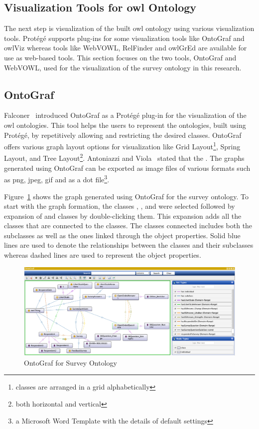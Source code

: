 \begin{doublespace}
\section{Visualization Tools for \ac{owl} Ontology}
\par The next step is visualization of the built \ac{owl} ontology using various visualization tools. Protégé supports plug-ins for some visualization tools like OntoGraf and \ac{owl}Viz whereas tools like WebVOWL, RelFinder and \ac{owl}GrEd are available for use as web-based tools. This section focuses on the two tools, OntoGraf and WebVOWL, used for the visualization of the survey ontology in this research.
\subsection{OntoGraf}
\par Falconer~\cite{falconer2010ontograf} introduced OntoGraf as a Protégé plug-in for the visualization of the \ac{owl} ontologies. This tool helps the users to represent the ontologies, built using Protégé, by repetitively allowing and restricting the desired classes. OntoGraf offers various graph layout options for visualization like Grid Layout\footnote{classes are arranged in a grid alphabetically}, Spring Layout, and Tree Layout\footnote{both horizontal and vertical}. Antoniazzi and Viola~\cite{antoniazz2018rdf} stated that the . The graphs generated using OntoGraf can be exported as image files of various formats such as \ac{png}, \ac{jpeg}, \ac{gif} and as a dot file\footnote{a Microsoft Word Template with the details of default settings}.
\par Figure~\ref{fig:4.17} shows the graph generated using OntoGraf for the survey ontology. To start with the graph formation, the classes , ,  and  were selected followed by expansion of  and  classes by double-clicking them. This expansion adds all the classes that are connected to the classes. The classes connected includes both the subclasses as well as the ones linked through the object properties. Solid blue lines are used to denote the relationships between the classes and their subclasses whereas dashed lines are used to represent the object properties.
\begin{figure}[htp]
    \centering
    \includegraphics[width=15cm]{images/ch4/Figure17.png}
    \caption{OntoGraf for Survey Ontology}
    \label{fig:4.17}
\end{figure}

\end{doublespace}
